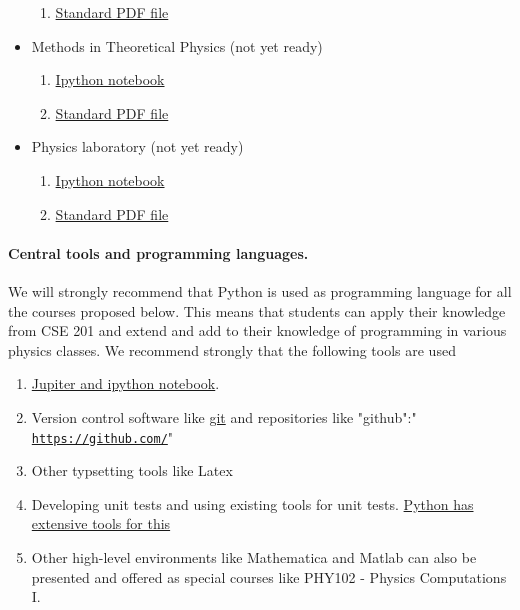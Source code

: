 \documentclass[%
oneside,                 %
final,                   %
10pt]{article}
\begin{document}
\begin{itemize}
\begin{enumerate}
  \item \href{{https://github.com/CompPhysics/PAComputationsMSU/tree/master/doc/pub/StatPhys/pdf/StatPhys-minted.pdf}}{Standard PDF file}

\end{enumerate}

\noindent
\item Methods in Theoretical Physics (not yet ready)
\begin{enumerate}

  \item \href{{https://github.com/CompPhysics/PAComputationsMSU/tree/master/doc/pub/}}{Ipython notebook}

  \item \href{{https://github.com/CompPhysics/PAComputationsMSU/tree/master/doc/pub/}}{Standard PDF file}

\end{enumerate}

\noindent
\item Physics laboratory (not yet ready)
\begin{enumerate}

  \item \href{{https://github.com/CompPhysics/PAComputationsMSU/tree/master/doc/pub/}}{Ipython notebook}

  \item \href{{https://github.com/CompPhysics/PAComputationsMSU/tree/master/doc/pub/}}{Standard PDF file}
\end{enumerate}

\noindent
\end{itemize}

\noindent
\paragraph{Central tools and programming languages.}
We will strongly recommend that Python is used as programming language for all the courses proposed below. This means that students can apply their knowledge from CSE 201 and extend and add to their knowledge of programming in various physics classes. We recommend strongly that the following tools are used
\begin{enumerate}
\item \href{{http://jupyter.org/}}{Jupiter and ipython notebook}. 

\item Version control software like \href{{https://git-scm.com/}}{git} and repositories like "github":" \href{{https://github.com/}}{\nolinkurl{https://github.com/}}"

\item Other typsetting tools like Latex

\item Developing unit tests and using existing tools for unit tests. \href{{https://docs.python.org/2/library/unittest.html}}{Python has extensive tools for this}

\item Other high-level environments like Mathematica and Matlab can also be presented and offered as special courses like PHY102 - Physics Computations I.  
\end{enumerate}
\end{document}
